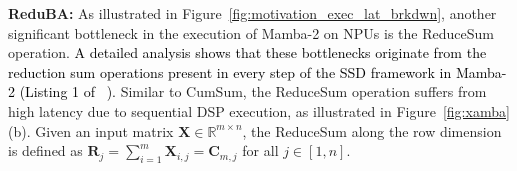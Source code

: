 
\textbf{ReduBA:} 
As illustrated in Figure~\ref{fig:motivation_exec_lat_brkdwn}, another significant bottleneck in the execution of Mamba-2 on NPUs is the ReduceSum operation.
\textcolor{black}{A detailed analysis shows that these bottlenecks originate from the reduction sum operations present in every step of the SSD framework in Mamba-2 (Listing 1 of ~\cite{mamba2}).}
Similar to CumSum, the ReduceSum operation suffers from high latency due to sequential DSP execution, as illustrated in Figure~\ref{fig:xamba}(b). Given an input matrix $\mathbf{X} \in \mathbb{R}^{m \times n}$, the ReduceSum along the row dimension is defined as $\mathbf{R}_{j} = \sum_{i=1}^{m} \mathbf{X}_{i,j} = \mathbf{C}_{m,j}$ for all $j \in [1, n]$.  

